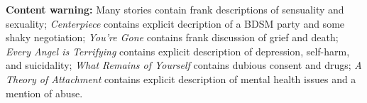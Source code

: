 \null

\vfill

\noindent \textbf{Content warning:} Many stories contain frank descriptions of sensuality and sexuality; \emph{Centerpiece} contains explicit decription of a BDSM party and some shaky negotiation; \emph{You're Gone} contains frank discussion of grief and death; \emph{Every Angel is Terrifying} contains explicit description of depression, self-harm, and suicidality; \emph{What Remains of Yourself} contains dubious consent and drugs; \emph{A Theory of Attachment} contains explicit description of mental health issues and a mention of abuse.
